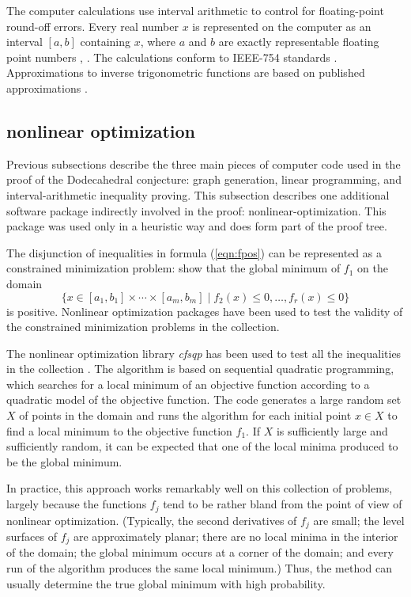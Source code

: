 The computer calculations use interval arithmetic to
control for floating-point round-off errors.  Every real number $x$
is represented on the computer as an interval $[a,b]$ containing $x$, where $a$ and $b$ are
exactly representable floating point numbers \cite{Interval}, \cite{Numerics}.
The calculations conform to IEEE-754 standards \cite{Float}.
Approximations to inverse trigonometric functions are based on 
published approximations \cite{Approx}.



\subsection{nonlinear optimization}

Previous subsections describe the three main pieces of computer
code used in the proof of the Dodecahedral conjecture: graph 
generation, linear programming, and interval-arithmetic inequality
proving.  This subsection describes one additional software
package indirectly involved in the proof: nonlinear-optimization.  
This package was used only in a heuristic way
and does form part of the proof tree.

The disjunction of inequalities in formula (\ref{eqn:fpos}) can
be represented as a constrained minimization problem: show that
the global minimum of $f_1$ on the domain
$$
\{x\in[a_1,b_1]\times\cdots\times[a_m,b_m] \mid  f_2(x)\le 0,\ldots,
  f_r(x)\le 0 \}
$$
is positive. Nonlinear optimization packages have been
used to test the validity of the constrained minimization
problems in the collection.

The nonlinear optimization library {\it cfsqp} has been used to
test all the inequalities in the collection \cite{cfsqp}.  
The algorithm
is based on sequential quadratic programming, which
searches for a local minimum of an objective function
according to a quadratic model of the objective
function.  The code generates a large random set $X$ of points in the
domain and runs the algorithm for each initial point $x\in X$ to
find a local minimum to the objective function $f_1$.  If $X$
is sufficiently large and sufficiently random, it can
be expected that one
of the local minima produced to be the  global minimum.

In practice, this approach works remarkably well on this
collection of problems, largely because the functions $f_j$
tend to be rather bland from the point of view of nonlinear
optimization.  (Typically, the second derivatives of $f_j$
are small; the level surfaces of $f_j$ are approximately planar;
there are no local minima in the interior of the domain;
the global minimum occurs at a corner of the domain; and
every run of the algorithm produces the same local minimum.)
Thus, the method can usually determine the true global minimum with
high probability.


